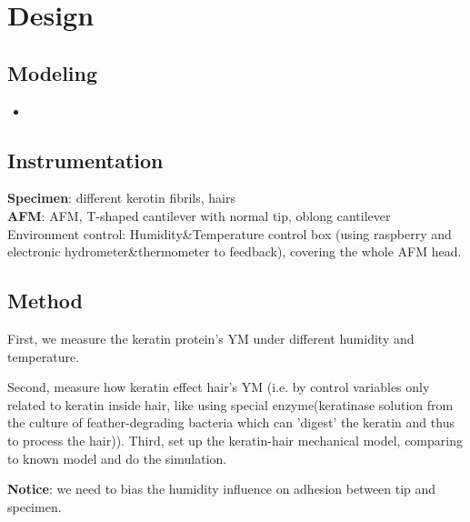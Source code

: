 \documentclass{article}
\begin{document}
\section{Design}
\subsection{Modeling}
\begin{itemize}
    \item 
\end{itemize}

\subsection{Instrumentation}
\textbf{Specimen}: different kerotin fibrils, hairs\\ 
\textbf{AFM}: AFM, T-shaped cantilever with normal tip, oblong cantilever\\
Environment control: Humidity\&Temperature control box (using raspberry and electronic hydrometer\&thermometer to feedback), covering the whole AFM head.

\subsection{Method}
First, we measure the keratin protein's YM under different humidity and temperature.

Second, measure how keratin effect hair's YM (i.e. by control variables only related to keratin inside hair, like using special enzyme(keratinase solution from the culture of feather-degrading bacteria which can 'digest' the keratin and thus to process the hair)\citep{lin1992purification}).  Third, set up the keratin-hair mechanical model, comparing to known model and do the simulation.


\textbf{Notice}: we need to bias the humidity influence on adhesion between tip and specimen.
\end{document}
